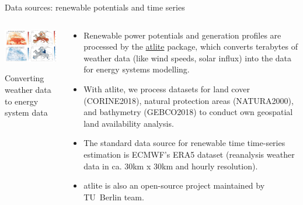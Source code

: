 \begin{frame}{Data sources: renewable potentials and time series}
 
  \begin{columns}[T]
  \begin{column}{7.5cm}

  \vspace{0.5cm}
  \centering

  \includegraphics[width=7.8cm]{images/atlite.jpg}

  {\footnotesize 
  Converting weather data to energy system data
  }
  \end{column}

  \begin{column}{8cm}
  {\footnotesize 
  \begin{itemize}
    \item Renewable power potentials and generation profiles are processed by 
    the \href{https://github.com/PyPSA/atlite}{\alert{atlite}} package, 
    which converts terabytes of weather data (like wind speeds, solar influx) 
    into the data for energy systems modelling.
    \item With atlite, we process datasets for land cover (CORINE2018), natural protection areas (NATURA2000), and bathymetry (GEBCO2018) to conduct own geospatial land availability analysis.
    \item The standard data source for renewable time time-series estimation is ECMWF's ERA5 dataset (reanalysis weather data in ca. 30km x 30km and hourly resolution). 
    \item  atlite is also an open-source project maintained by TU~Berlin team. \\
    \faGithub~ \\
    \faBook~

  \end{itemize}
  }
  \end{column}
  \end{columns}

\end{frame}



